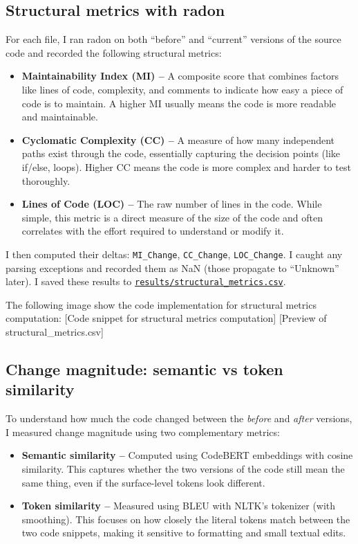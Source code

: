 \documentclass[10pt,a4paper]{report}
\begin{document}
\subsection{Structural metrics with radon}
For each file, I ran radon on both ``before'' and ``current'' versions of the source code and recorded the following structural metrics:
\begin{itemize}[itemsep=0.05em, topsep=0pt]
    \item \textbf{Maintainability Index (MI) --} A composite score that combines factors like lines of code, complexity, and comments to indicate how easy a piece of code is to maintain. A higher MI usually means the code is more readable and maintainable.
    \item \textbf{Cyclomatic Complexity (CC) --} A measure of how many independent paths exist through the code, essentially capturing the decision points (like if/else, loops). Higher CC means the code is more complex and harder to test thoroughly.
    \item \textbf{Lines of Code (LOC) --} The raw number of lines in the code. While simple, this metric is a direct measure of the size of the code and often correlates with the effort required to understand or modify it.
\end{itemize}

I then computed their deltas: \texttt{MI\_Change}, \texttt{CC\_Change}, \texttt{LOC\_Change}. I caught any parsing exceptions and recorded them as NaN (those propagate to ``Unknown'' later). I saved these results to \href{https://github.com/ShardulJunagade/cs202-stt/blob/main/lab3/results/structural_metrics.csv}{\texttt{results/structural\_metrics.csv}}.

The following image show the code implementation for structural metrics computation:
[Code snippet for structural metrics computation]
[Preview of structural\_metrics.csv]

\subsection{Change magnitude: semantic vs token similarity}
To understand how much the code changed between the \textit{before} and \textit{after} versions, I measured change magnitude using two complementary metrics:

\begin{itemize}[itemsep=0.05em, topsep=0pt]
    \item \textbf{Semantic similarity --} Computed using CodeBERT embeddings with cosine similarity. 
    This captures whether the two versions of the code still mean the same thing, even if the surface-level tokens look different.
    
    \item \textbf{Token similarity --} Measured using BLEU with NLTK’s tokenizer (with smoothing). 
    This focuses on how closely the literal tokens match between the two code snippets, making it sensitive to formatting and small textual edits.
\end{itemize}
\end{document}
